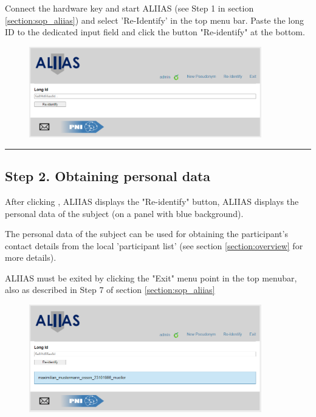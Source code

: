 Connect the hardware key and start ALIIAS (see Step 1 in section \ref{section:sop_aliias}) and select 'Re-Identify' in the top menu bar. 
Paste the long ID to the dedicated input field and click the button "Re-identify" at the bottom.

\small\setlength\fboxsep{5pt}\setlength\fboxrule{1pt}

\small\setlength\fboxsep{5pt}\setlength\fboxrule{1pt}

\begin{figure}[H]
\includegraphics[width=0.9\textwidth]{docs/fig/06_reidentify.PNG}
\end{figure}

\par\noindent\rule{\textwidth\color{pniblue}}{0.4pt}
\subsection*{Step 2. Obtaining personal data}

After clicking , ALIIAS displays the "Re-identify" button, ALIIAS displays the personal data of the subject (on a panel with blue background).

The personal data of the subject can be used for obtaining the participant's contact details from the local 'participant list' (see section \ref{section:overview} for more details).

ALIIAS must be exited by clicking the "Exit" menu point in the top menubar, also as described in Step 7 of section \ref{section:sop_aliias}

\begin{figure}[H]
\includegraphics[width=0.9\textwidth]{docs/fig/07_reidentify_result.PNG}
\end{figure}
